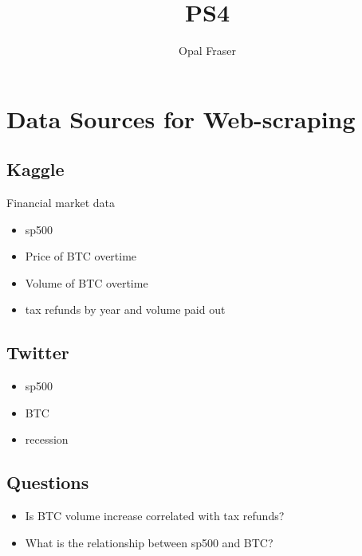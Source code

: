 \documentclass{article}
\title{PS4}
\author{Opal Fraser}
\begin{document}
\maketitle

\section{Data Sources for Web-scraping}

\subsection{Kaggle}
Financial market data
\begin{itemize}
\item sp500
\item Price of BTC overtime
\item Volume of BTC overtime
\item tax refunds by year and volume paid out 
\end{itemize}
\subsection {Twitter}
\begin{itemize}
\item sp500
\item BTC
\item recession
\end{itemize}
\subsection{Questions}
\begin{itemize}
\item Is BTC volume increase correlated with tax refunds? 
\item What is the relationship between sp500 and BTC? 
\end{itemize}
\end{document}
